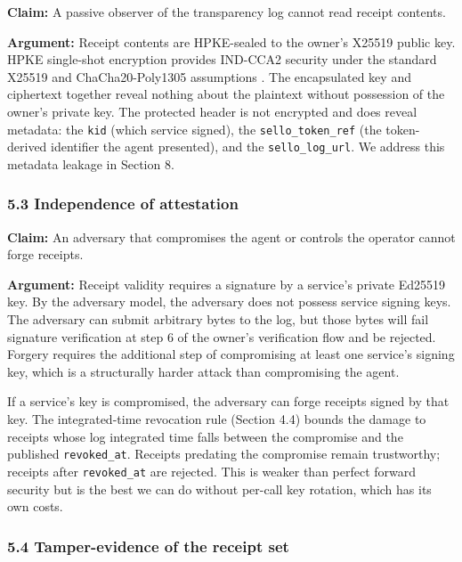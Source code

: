 \documentclass[
  11pt,
]{article}
\begin{document}
\textbf{Claim:} A passive observer of the transparency log cannot read
receipt contents.

\textbf{Argument:} Receipt contents are HPKE-sealed to the owner's
X25519 public key. HPKE single-shot encryption provides IND-CCA2
security under the standard X25519 and ChaCha20-Poly1305 assumptions
\citep{RFC9180}. The encapsulated key and ciphertext together reveal
nothing about the plaintext without possession of the owner's private
key. The protected header is not encrypted and does reveal metadata: the
\texttt{kid} (which service signed), the \texttt{sello\_token\_ref} (the
token-derived identifier the agent presented), and the
\texttt{sello\_log\_url}. We address this metadata leakage in Section 8.

\hypertarget{independence-of-attestation}{%
\subsubsection{5.3 Independence of
attestation}\label{independence-of-attestation}}

\textbf{Claim:} An adversary that compromises the agent or controls the
operator cannot forge receipts.

\textbf{Argument:} Receipt validity requires a signature by a service's
private Ed25519 key. By the adversary model, the adversary does not
possess service signing keys. The adversary can submit arbitrary bytes
to the log, but those bytes will fail signature verification at step 6
of the owner's verification flow and be rejected. Forgery requires the
additional step of compromising at least one service's signing key,
which is a structurally harder attack than compromising the agent.

If a service's key is compromised, the adversary can forge receipts
signed by that key. The integrated-time revocation rule (Section 4.4)
bounds the damage to receipts whose log integrated time falls between
the compromise and the published \texttt{revoked\_at}. Receipts
predating the compromise remain trustworthy; receipts after
\texttt{revoked\_at} are rejected. This is weaker than perfect forward
security but is the best we can do without per-call key rotation, which
has its own costs.

\hypertarget{tamper-evidence-of-the-receipt-set}{%
\subsubsection{5.4 Tamper-evidence of the receipt
set}\label{tamper-evidence-of-the-receipt-set}}
\end{document}
